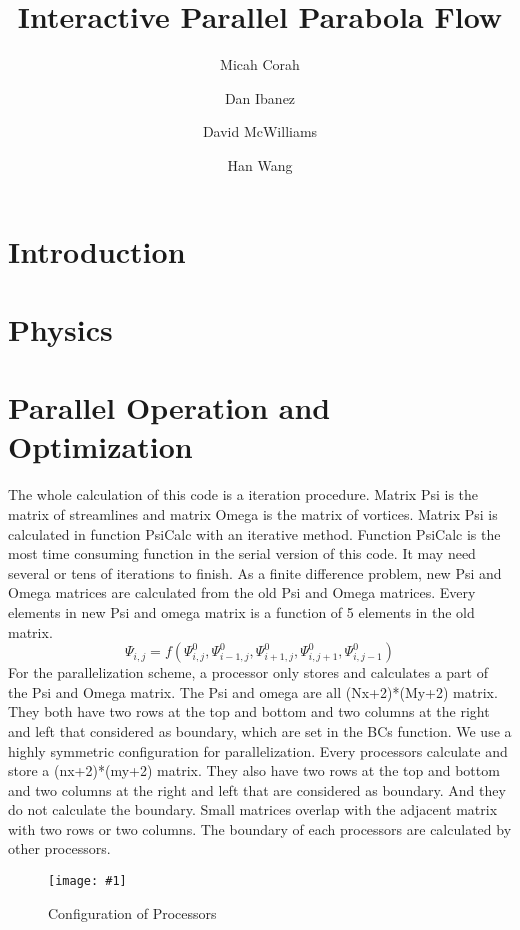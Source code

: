 \documentclass[twocolumn]{article}
\title{Interactive Parallel Parabola Flow}
\author{
Micah Corah
\and
Dan Ibanez
\and
David McWilliams
\and
Han Wang
}
\newcommand{\myimage}[3]{
\begin{figure}[!ht]
\caption{#2}
\label{#3}
\texttt{[image: \#1]}
\end{figure}
}
\begin{document}
\maketitle
\section{Introduction}
\section{Physics}
\section{Parallel Operation and Optimization}
The whole calculation of this code is a iteration procedure.
Matrix Psi is the matrix of streamlines and matrix Omega is the matrix of vortices.
Matrix Psi is calculated in function PsiCalc with an iterative method.
Function PsiCalc is the most time consuming function in the serial version
of this code.
It may need several or tens of iterations to finish.
As a finite difference problem, new Psi and Omega matrices are calculated from
the old Psi and Omega matrices.
Every elements in new Psi and omega matrix is a function of 5 elements in the old
matrix.
\[\Psi_{i,j}=f(\Psi^0_{i,j},\Psi^0_{i-1,j},\Psi^0_{i+1,j},\Psi^0_{i,j+1},\Psi^0_{i,j-1})\]
For the parallelization scheme, a processor only stores and calculates a part
of the Psi and Omega matrix.
The Psi and omega are all (Nx+2)*(My+2) matrix.
They both have two rows at the top and bottom and two columns at the right
and left that considered as boundary, which are set in the BCs function.
We use a highly symmetric configuration for parallelization.
Every processors calculate and store a (nx+2)*(my+2) matrix.
They also have  two rows at the top and bottom and two columns at the right
and left that are considered as boundary.
And they do not calculate the boundary.
Small matrices  overlap with the adjacent matrix with two rows or two columns.
The boundary of each processors are calculated by other processors.

\myimage{configuration.png}{Configuration of Processors}{fig:configuration}
\end{document}

